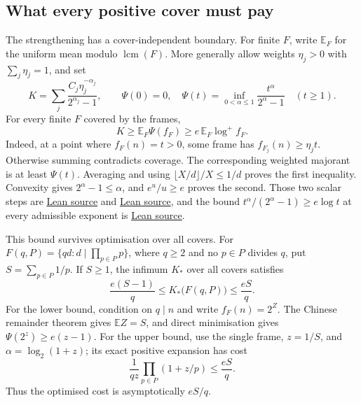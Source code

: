 \documentclass[11pt]{article}
\begin{document}
\subsection{What every positive cover must pay}
The strengthening has a cover-independent boundary.  For finite $F$, write
$\mathbb E_F$ for the uniform mean modulo $\operatorname{lcm}(F)$.
More generally allow weights $\eta_j>0$ with $\sum_j\eta_j=1$, and set
\[
 K=\sum_j\frac{C_j\eta_j^{-\alpha_j}}{2^{\alpha_j}-1},\qquad
 \Psi(0)=0,\quad
 \Psi(t)=\inf_{0<\alpha\le1}\frac{t^\alpha}{2^\alpha-1}\quad(t\ge1).
\]
For every finite $F$ covered by the frames,
\begin{equation}
 K\ge\mathbb E_F\Psi(f_F)\ge e\,\mathbb E_F\log^+f_F.
 \label{eq:cover-log-obstruction}
\end{equation}
Indeed, at a point where $f_F(n)=t>0$, some frame has
$f_{F_j}(n)\ge\eta_jt$.  Otherwise summing contradicts coverage.
The corresponding weighted majorant is at least $\Psi(t)$.
Averaging and using $\lfloor X/d\rfloor/X\le1/d$ proves the first
inequality.  Convexity gives $2^\alpha-1\le\alpha$, and
$e^u/u\ge e$ proves the second.  Those two scalar steps are
\href{https://github.com/wcook04/plectis-erdos/blob/f36a98bf3d3e6f65f1074e3b800e3293d5b8a51a/ErdosProblems/Erdos257/PaperCompleteR7/CoverKernel.lean#L170}{Lean source} and
\href{https://github.com/wcook04/plectis-erdos/blob/f36a98bf3d3e6f65f1074e3b800e3293d5b8a51a/ErdosProblems/Erdos257/PaperCompleteR7/CoverKernel.lean#L177}{Lean source}, and the bound
$t^\alpha/(2^\alpha-1)\ge e\log t$ at every admissible exponent is
\href{https://github.com/wcook04/plectis-erdos/blob/f36a98bf3d3e6f65f1074e3b800e3293d5b8a51a/ErdosProblems/Erdos257/PaperCompleteR7/CoverKernel.lean#L188}{Lean source}.

This bound survives optimisation over all covers.  For
$F(q,P)=\{qd:d\mid\prod_{p\in P}p\}$, where $q\ge2$ and no $p\in P$
divides $q$, put $S=\sum_{p\in P}1/p$.  If $S\ge1$, the infimum $K_*$
over all covers satisfies
\begin{equation}
 \frac{e(S-1)}q\le K_*\bigl(F(q,P)\bigr)\le\frac{eS}q.
 \label{eq:optimal-cube-cost}
\end{equation}
For the lower bound, condition on $q\mid n$ and write
$f_F(n)=2^Z$.  The Chinese remainder theorem gives
$\mathbb EZ=S$, and direct minimisation gives
$\Psi(2^z)\ge e(z-1)$.  For the upper bound, use the single frame,
$z=1/S$, and $\alpha=\log_2(1+z)$; its exact positive expansion has cost
\[
 \frac1{qz}\prod_{p\in P}(1+z/p)\le\frac{eS}q.
\]
Thus the optimised cost is asymptotically $eS/q$.
\end{document}
